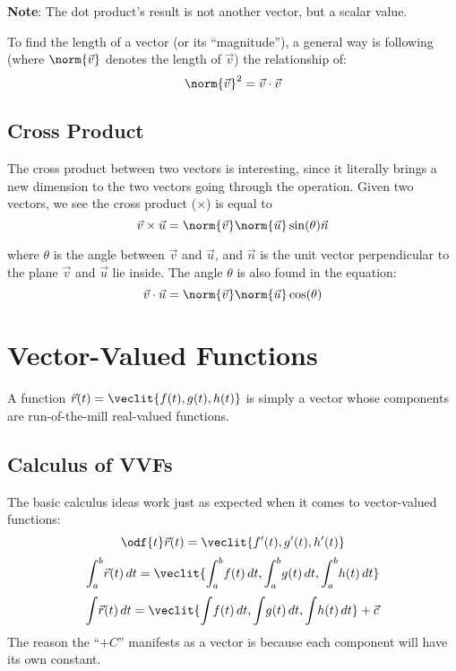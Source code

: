 \documentclass{article}
\begin{document}
\textbf{Note}: The dot product's result is not another vector, but a scalar value.

To find the length of a vector (or its ``magnitude''), a general
way is following (where $\norm{\vec{v}}$ denotes the length of $\vec{v}$)
the relationship of:
\begin{equation}\label{vec-length-defn}
  \norm{\vec{v}}^{2} = \vec{v} \cdot \vec{v}
\end{equation}

\subsection{Cross Product}
The cross product between two vectors is interesting, since
it literally brings a new dimension to the two vectors going through the operation.
Given two vectors, we see the cross product ($\times$) is equal to
\begin{equation}
  \vec{v} \times \vec{u} = \norm{\vec{v}}\norm{\vec{u}}\sin(\theta)\vec{n}
\end{equation}

where $\theta$ is the angle between $\vec{v}$ and $\vec{u}$, and $\vec{n}$ is the unit vector
perpendicular to the plane $\vec{v}$ and $\vec{u}$ lie inside. The angle $\theta$ is also found in the equation:
\begin{equation}
  \vec{v} \cdot \vec{u} = \norm{\vec{v}}\norm{\vec{u}}\cos(\theta)
\end{equation}

\section{Vector-Valued Functions}
A function $\vec{r}(t) = \veclit{f(t), g(t), h(t)}$ is simply a vector whose
components are run-of-the-mill real-valued functions.

\subsection{Calculus of VVFs}
The basic calculus ideas work just as expected when it comes to vector-valued functions:
\begin{equation}\label{vvf-drdt}
  \odf{t}\vec{r}(t) = \veclit{f'(t), g'(t), h'(t)}
\end{equation}
\begin{equation}\label{vvf-int-definite}
  \int_{a}^{b}\! \vec{r}(t)\,dt = \veclit{\int_{a}^{b}\! f(t)\,dt, \int_{a}^{b}\! g(t)\,dt, \int_{a}^{b}\! h(t)\,dt}
\end{equation}
\begin{equation}\label{vvf-int-indefinite}
  \int\!\vec{r}(t)\,dt = \veclit{\int\! f(t)\,dt, \int\! g(t)\,dt, \int\! h(t)\,dt} + \vec{c}
\end{equation}
The reason the ``$+ C$'' manifests as a vector is because each component will have its own constant.
\end{document}
